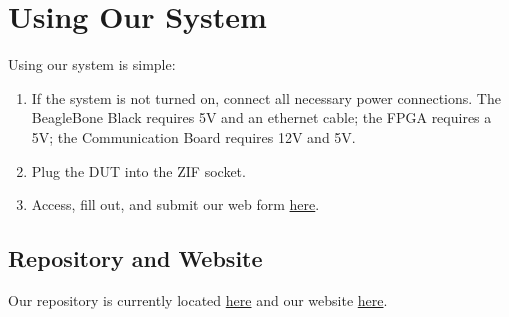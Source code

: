 \section{Using Our System}
Using our system is simple: 
\begin{enumerate}
\item If the system is not turned on, connect all necessary power connections. The BeagleBone Black requires 5V and an ethernet cable; the FPGA requires a 5V; the Communication Board requires 12V and 5V. 
\item Plug the DUT into the ZIF socket.
\item Access, fill out, and submit our web form \href{http://line-norm-gifford.cs.utah.edu:8080/}{here}.
\end{enumerate}

\subsection{Repository and Website}
Our repository is currently located \href{https://github.com/normgiff/Masters}{here} and our website \href{http://normgiff.github.io/Masters/}{here}.

\newpage